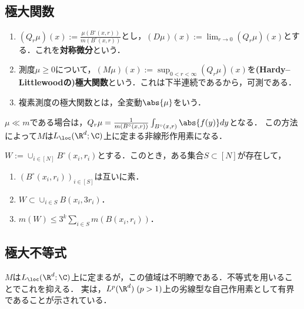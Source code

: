 \documentclass[uplatex, dvipdfmx]{jsreport}
\begin{document}
\subsection{極大関数}

\begin{definition}\mbox{}
    \begin{enumerate}
        \item $(Q_r\mu)(x):=\frac{\mu(B^\circ(x,r))}{m(B^\circ(x,r))}$とし，$(D\mu)(x):=\lim_{r\to0}(Q_r\mu)(x)$とする．これを\textbf{対称微分}という．
        \item 測度$\mu\ge0$について，$(M\mu)(x):=\sup_{0<r<\infty}(Q_r\mu)(x)$を\textbf{(Hardy–Littlewoodの)極大関数}という．これは下半連続であるから，可測である．
        \item 複素測度の極大関数とは，全変動$\abs{\mu}$をいう．
    \end{enumerate}
\end{definition}
\begin{remarks}
    $\mu\ll m$である場合は，$Q_r\mu=\frac{1}{m(B^\circ(x,r))}\int_{B^\circ(x,r)}\abs{f(y)}dy$となる．
    この方法によって$M$は$L_\loc(\R^d;\C)$上に定まる非線形作用素になる．
\end{remarks}

\begin{lemma}
    $W:=\cup_{i\in[N]}B^\circ(x_i,r_i)$とする．このとき，ある集合$S\subset[N]$が存在して，
    \begin{enumerate}
        \item $(B^\circ(x_i,r_i))_{i\in[S]}$は互いに素．
        \item $W\subset\cup_{i\in S}B(x_i,3r_i)$．
        \item $m(W)\le 3^k\sum_{i\in S}m(B(x_i,r_i))$．
    \end{enumerate}
\end{lemma}

\subsection{極大不等式}

\begin{tcolorbox}[colframe=ForestGreen, colback=ForestGreen!10!white,breakable,colbacktitle=ForestGreen!40!white,coltitle=black,fonttitle=\bfseries\sffamily,
title=]
    $M$は$L_\loc(\R^d;\C)$上に定まるが，この値域は不明瞭である．不等式を用いることでこれを抑える．
    実は，$L^p(\R^d)\;(p>1)$上の劣線型な自己作用素として有界であることが示されている．
\end{tcolorbox}
\end{document}
